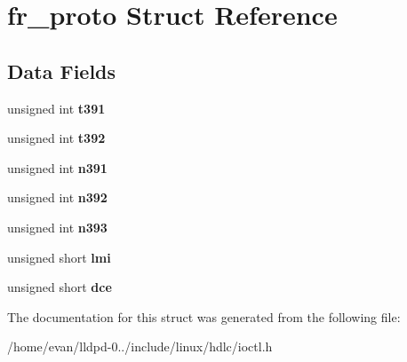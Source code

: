 \section{fr\-\_\-proto \-Struct \-Reference}
\label{structfr__proto}
\subsection*{\-Data \-Fields}
\begin{DoxyCompactItemize}
\item 
unsigned int {\bfseries t391}\label{structfr__proto_aafa6a3dac81904bcf180c2e4546d7eb3}

\item 
unsigned int {\bfseries t392}\label{structfr__proto_ad96740a91258b8e6e152198261a9de37}

\item 
unsigned int {\bfseries n391}\label{structfr__proto_aeca2a43295144e3b77cefe92be1fd601}

\item 
unsigned int {\bfseries n392}\label{structfr__proto_a6cf28627ef8a00eab68e24b0fee7df2d}

\item 
unsigned int {\bfseries n393}\label{structfr__proto_a7fc578ecffaa5e34385df3d8feca6b17}

\item 
unsigned short {\bfseries lmi}\label{structfr__proto_a5e9a22ecc165af7349a2a08abad1456f}

\item 
unsigned short {\bfseries dce}\label{structfr__proto_ab8f5a1166714bfabf34f7d1184ce5e06}

\end{DoxyCompactItemize}


\-The documentation for this struct was generated from the following file\-:\begin{DoxyCompactItemize}
\item 
/home/evan/lldpd-\/0../include/linux/hdlc/ioctl.\-h\end{DoxyCompactItemize}
